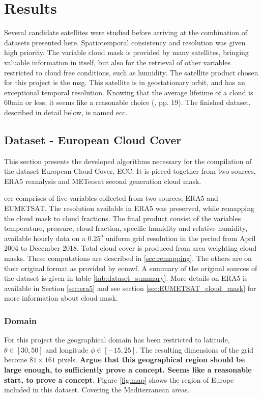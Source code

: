 \chapter{Results}
Several candidate satellites were studied before arriving at the combination of datasets presented here. Spatiotemporal consistency and resolution was given high priority. 
The variable cloud mask is provided by many satellites, bringing valuable information in itself, but also for the retrieval of other variables restricted to cloud free conditions, such as humidity. The satellite product chosen for this project is the \acrfull{msg}. This satellite is in geostationary orbit, and has an exceptional temporal resolution. Knowing that the average lifetime of a cloud is 60min or less, it seems like a reasonable choice (\cite{lohmann2016}, pp. 19). The finished dataset, described in detail below, is named \acrfull{ecc}.

\section{Dataset - European Cloud Cover }
This section presents the developed algorithms necessary for the compilation of the dataset European Cloud Cover, ECC. It is pieced together from two sources, ERA5 reanalysis and METeosat second generation cloud mask. %

\acrfull{ecc} comprises of five variables collected from two sources; ERA5 and EUMETSAT. The resolution available in ERA5 was preserved, while remapping the cloud mask to cloud fractions. The final product consist of the variables temperature, pressure, cloud fraction, specific humidity and relative humidity, available hourly data on a $0.25^o$ uniform grid resolution in the period from April 2004 to December 2018. Total cloud cover is produced from area weighting cloud masks. These computations are described in \ref{sec:remapping}. The others are on their original format as provided by \acrfull{ecmwf}. A summary of the original sources of the dataset is given in table \ref{tab:dataset_summary}. More details on ERA5 is available in Section \ref{sec:era5} and see section \ref{sec:EUMETSAT_cloud_mask} for more information about cloud mask. 


\subsection{Domain}
For this project the geographical domain has been restricted to latitude, $\theta \in[30,50]$ and longitude $\phi \in [-15, 25]$. The resulting dimensions of the grid become $81\times161$ pixels.\textbf{ Argue that this geographical region should be large enough, to sufficiently prove a concept. Seems like a reasonable start, to prove a concept.}
Figure \ref{fig:map} shows the region of Europe included in this dataset. Covering the Mediterranean areas.

